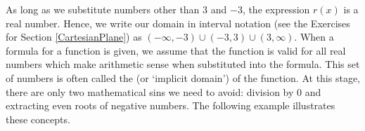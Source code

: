 As long as we substitute numbers other than $3$ and $-3$, the expression $r(x)$ is a real number.  Hence, we write our domain in interval notation (see the Exercises for Section \ref{CartesianPlane}) as  $(-\infty, -3) \cup (-3,3) \cup (3, \infty)$.  When a formula for a function is given, we assume that the function is valid for all real numbers which make arithmetic sense when substituted into the formula.  This set of numbers is often called the  (or `implicit domain') of the function.  At this stage, there are only two mathematical sins we need to avoid:  division by $0$ and extracting even roots of negative numbers.  The following example illustrates these concepts.

\medskip

